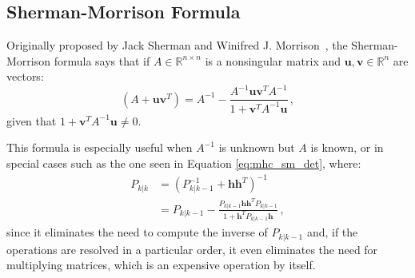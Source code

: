 \subsection{Sherman-Morrison Formula} \label{add:shermanmorrison_formula}
Originally proposed by Jack Sherman and Winifred J. Morrison~\cite{sherman1950adjustment}, the Sherman-Morrison formula says that if $A\in\mathbb{R}^{n\times n}$ is a nonsingular matrix and $\mathbf{u}, \mathbf{v} \in\mathbb{R}^n$ are vectors:
    \begin{equation*}
        (A + \mathbf{u}\mathbf{v}^T) = A^{-1} - \frac{A^{-1}\mathbf{u}\mathbf{v}^T A^{-1}}{1 + \mathbf{v}^T A^{-1} \mathbf{u}}\,,
    \end{equation*}
given that $1 + \mathbf{v}^T A^{-1} \mathbf{u} \neq 0$.

\newpage

This formula is especially useful when $A^{-1}$ is unknown but $A$ is known, or in special cases such as the one seen in Equation \eqref{eq:mhc_sm_det}, where:
    \begin{align*}
        P_{k|k} &= (P_{k|k-1}^{-1} + \mathbf{h}\mathbf{h}^T)^{-1}\\
        &= P_{k|k-1} - \frac{P_{k|k-1} \mathbf{h} \mathbf{h}^T P_{k|k-1}} {1 + \mathbf{h}^T P_{k|k-1} \mathbf{h}}\,,
    \end{align*}
since it eliminates the need to compute the inverse of $P_{k|k-1}$ and, if the operations are resolved in a particular order, it even eliminates the need for multiplying matrices, which is an expensive operation by itself. 
